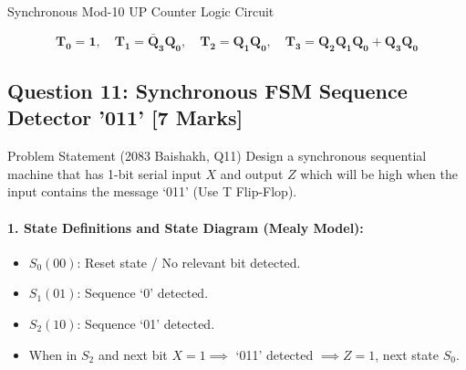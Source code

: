 \documentclass[11pt,a4paper,oneside]{book}
\begin{document}
\begin{schematicbox}{Synchronous Mod-10 UP Counter Logic Circuit}
\end{schematicbox}

\begin{answerbox}
$$\mathbf{T_0 = 1, \quad T_1 = \bar{Q}_3 Q_0, \quad T_2 = Q_1 Q_0, \quad T_3 = Q_2 Q_1 Q_0 + Q_3 Q_0}$$
\end{answerbox}

\vspace{0.6cm}

\subsection{Question 11: Synchronous FSM Sequence Detector '011' [7 Marks]}
\begin{questionbox}{Problem Statement (2083 Baishakh, Q11)}
Design a synchronous sequential machine that has 1-bit serial input $X$ and output $Z$ which will be high when the input contains the message `011' (Use T Flip-Flop).
\end{questionbox}

\paragraph{1. State Definitions and State Diagram (Mealy Model):}
\begin{itemize}
  \item $S_0 (00)$: Reset state / No relevant bit detected.
  \item $S_1 (01)$: Sequence `0' detected.
  \item $S_2 (10)$: Sequence `01' detected.
  \item When in $S_2$ and next bit $X=1 \implies$ `011' detected $\implies Z=1$, next state $S_0$.
\end{itemize}
\end{document}
